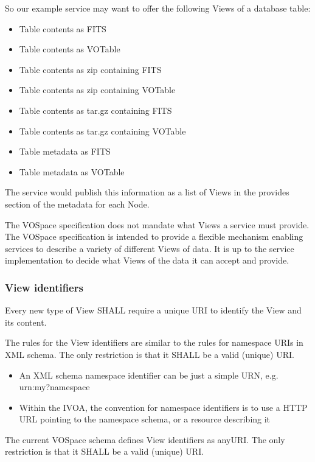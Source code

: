 \documentclass[11pt,a4paper]{ivoa}
\begin{document}
So our example service may want to offer the following Views of a database table:

\begin{itemize}
    \item Table contents as FITS
    \item Table contents as VOTable
    \item Table contents as zip containing FITS
    \item Table contents as zip containing VOTable
    \item Table contents as tar.gz containing FITS
    \item Table contents as tar.gz containing VOTable
    \item Table metadata as FITS
    \item Table metadata as VOTable
\end{itemize}

The service would publish this information as a list of Views in the provides section of the metadata for each Node.

The VOSpace specification does not mandate what Views a service must provide. The VOSpace specification is intended to provide a flexible mechanism enabling services to describe a variety of different Views of data. It is up to the service implementation to decide what Views of the data it can accept and provide.

\subsubsection{View identifiers}
\label{subsubsec:view identifiers}
Every new type of View SHALL require a unique URI to identify the View and its content.

The rules for the View identifiers are similar to the rules for namespace URIs in XML schema. The only restriction is that it SHALL be a valid (unique) URI.

\begin{itemize}
    \item An XML schema namespace identifier can be just a simple URN, e.g. urn:my?namespace
    \item Within the IVOA, the convention for namespace identifiers is to use a HTTP URL pointing to the namespace schema, or a resource describing it
\end{itemize}

The current VOSpace schema defines View identifiers as anyURI. The only restriction is that it SHALL be a valid (unique) URI.
\end{document}
